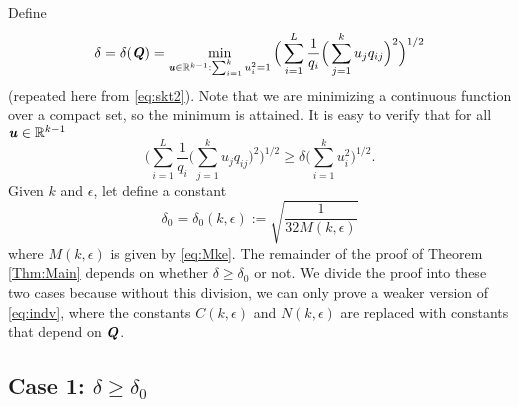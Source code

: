 \documentclass[11pt,onecolumn]{IEEEtran}
\def\mathbi#1{{\textbf{\textit #1}}}
\begin{document}
Define 
\begin{equation}\label{eq:defdt}
\delta=\delta(\mathbi{Q})=\min_{\mathbi{u}\in\mathbb{R}^{k-1}: \sum_{i=1}^k u_i^2=1}
\Big(\sum_{i=1}^L \frac{1}{q_i} \Big(\sum_{j=1}^k u_j q_{ij} \Big)^2\Big)^{1/2}
\end{equation}
(repeated here from \eqref{eq:skt2}). Note that we are minimizing a continuous function over a compact set, so the minimum is attained.
It is easy to verify that for all $\mathbi{u}\in\mathbb{R}^{k-1}$
\begin{equation}\label{eq:defdelta}
\Big(\sum_{i=1}^L \frac{1}{q_i} \Big(\sum_{j=1}^k u_j q_{ij} \Big)^2\Big)^{1/2}
\ge \delta \Big(\sum_{i=1}^k u_i^2\Big)^{1/2}.
\end{equation}
Given $k$ and $\epsilon$, let define a constant
\begin{equation}\label{eq:defd0}
\delta_0 = \delta_0(k,\epsilon) := \sqrt{ \frac{1}{32M(k,\epsilon)}}
\end{equation}
where $M(k,\epsilon)$ is given by \eqref{eq:Mke}. %
The remainder of the proof of Theorem \ref{Thm:Main} depends on whether $\delta\ge \delta_0$ or not.
We divide the proof into these two cases because without this division, we can only prove a weaker version of \eqref{eq:indv}, where the constants $C(k,\epsilon)$ and $N(k,\epsilon)$ are replaced with constants that depend on $\mathbi{Q}$.

\subsection{\bf Case 1: $\delta\ge \delta_0$}
\end{document}
